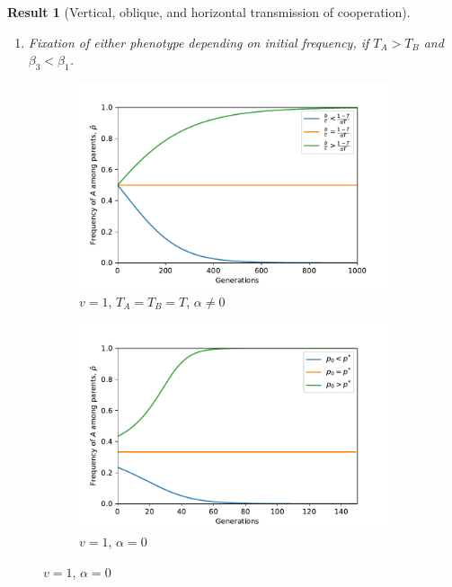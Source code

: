 \documentclass[12pt]{extarticle}
\newtheorem{result}{Result}
\begin{document}
{\begin{result}[Vertical, oblique, and horizontal transmission of cooperation]
\begin{enumerate}
\item \emph{Fixation of either phenotype depending on initial frequency}, if $T_A>T_B$ and $\beta_3<\beta_1$.

\end{enumerate}
\end{result}



\begin{figure}[H]
  \centering
  \begin{subfigure}{8cm}
    \includegraphics[scale=0.5]{figure2a.pdf}
    \caption{$v=1$, $T_A=T_B=T$, $\alpha \neq 0$}
    \label{fig:results_a}
  \end{subfigure}
  \begin{subfigure}{8cm}
    \includegraphics[scale=0.5]{figure2b.pdf}
    \caption{$v=1$, $\alpha = 0$}
    \label{fig:results_b}
  \end{subfigure}

\end{figure}}
\end{document}
